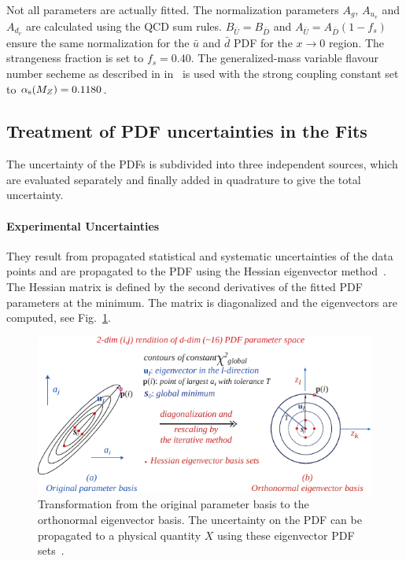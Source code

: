 Not all parameters are actually fitted. The normalization parameters $A_g$,
$A_{u_{v}}$ and $A_{d_{v}}$ are calculated using the QCD sum rules. $B_{\bar
U}=B_{\bar D}$ and $A_{\bar U} = A_{\bar D}(1-f_s)$ ensure the same
normalization for the $\bar u$ and $\bar d$ PDF for the $x \rightarrow 0$
region. The strangeness fraction is set to $f_s = 0.40$. The generalized-mass
variable flavour number secheme as described in
in~\cite{Thorne:1997ga,Thorne:2006qt} is used with the strong coupling constant
set to $\alpha_\mathrm{s}(M_Z)= 0.1180$.


\subsection{Treatment of PDF uncertainties in the Fits}
\label{section:treatment_pdf_uncertainties}

The uncertainty of the PDFs is subdivided into three independent sources, which
are evaluated separately and finally added in quadrature to give the total
uncertainty.

\paragraph{Experimental Uncertainties} They result from propagated statistical and systematic
uncertainties of the data points and are propagated to the PDF using the Hessian
eigenvector method~\cite{Pumplin:2001ct}. The Hessian matrix is defined by the second derivatives of
the fitted PDF parameters at the \chisq minimum. The matrix is diagonalized and
the eigenvectors are computed, see Fig.~\ref{fig:eigenvector_basis_set}. 

\begin{figure}[htb]
  \centering
  \includegraphics[width=1.0\textwidth]{figures/pdf_constraints/hessianmethod.pdf}
  \caption[Transformation of the parameter basis to the eigenvector basis.]
    {Transformation from the original parameter basis to the orthonormal
    eigenvector basis. The uncertainty on the PDF can be propagated to a
    physical quantity $X$ using these eigenvector PDF sets~\cite{Pumplin:2001ct}.}
    \label{fig:eigenvector_basis_set}
\end{figure}

